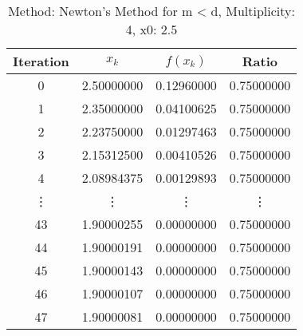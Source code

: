 \begin{table}
\centering
\caption{Method: Newton's Method for m < d, Multiplicity: 4, x0: 2.5}
\label{tab:table_Newton's_Method_for_m_<_d_4_2_5}
\begin{tabular}{c c c c}
\toprule
Iteration &      $x_k$ &   $f(x_k)$ &      Ratio \\
\midrule
        0 & 2.50000000 & 0.12960000 & 0.75000000 \\
        1 & 2.35000000 & 0.04100625 & 0.75000000 \\
        2 & 2.23750000 & 0.01297463 & 0.75000000 \\
        3 & 2.15312500 & 0.00410526 & 0.75000000 \\
        4 & 2.08984375 & 0.00129893 & 0.75000000 \\
   \vdots &     \vdots &     \vdots &     \vdots \\
       43 & 1.90000255 & 0.00000000 & 0.75000000 \\
       44 & 1.90000191 & 0.00000000 & 0.75000000 \\
       45 & 1.90000143 & 0.00000000 & 0.75000000 \\
       46 & 1.90000107 & 0.00000000 & 0.75000000 \\
       47 & 1.90000081 & 0.00000000 & 0.75000000 \\
\bottomrule
\end{tabular}
\end{table}
